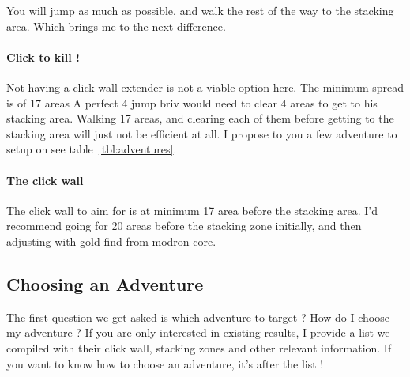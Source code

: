 \documentclass{article}
\begin{document}
You will jump as much as possible, and walk the rest of the way to the stacking area.
Which brings me to the next difference.

\paragraph{Click to kill !}
Not having a click wall extender is not a viable option here. 
The minimum spread is of 17 areas 
A perfect 4 jump briv would need to clear 4 areas to get to his stacking area.
Walking 17 areas, and clearing each of them before getting to the stacking area will just not be efficient at all.
I propose to you a few adventure to setup on see table~\ref{tbl:adventures}.

\paragraph{The click wall}
The click wall to aim for is at minimum 17 area before the stacking area.
I'd recommend going for 20 areas before the stacking zone initially, and then adjusting with gold find from modron core.

\subsection{Choosing an Adventure}

The first question we get asked is which adventure to target ?
How do I choose my adventure ?
If you are only interested in existing results, I provide a list we compiled with their click wall, stacking zones and other relevant information.
If you want to know how to choose an adventure, it's after the list !
\end{document}
